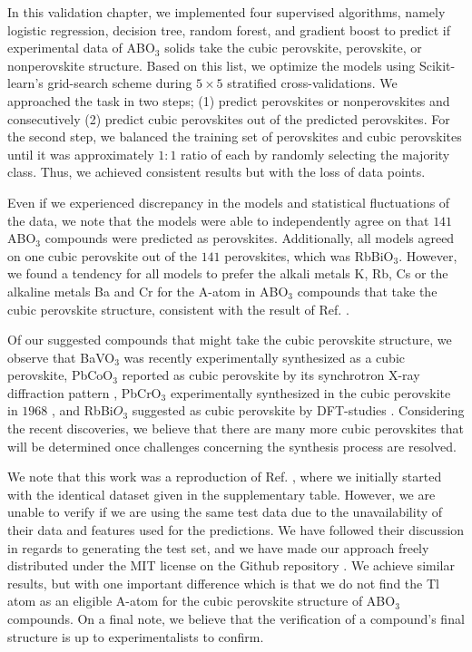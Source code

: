 In this validation chapter, we implemented four supervised algorithms, namely logistic regression, decision tree, random forest, and gradient boost to predict if experimental data of ABO$_3$ solids take the cubic perovskite, perovskite, or nonperovskite structure. Based on this list, we optimize the models using Scikit-learn's \cite{Pedregosa2012} grid-search scheme during $5\times 5$ stratified cross-validations. We approached the task in two steps; (1) predict perovskites or nonperovskites and consecutively (2) predict cubic perovskites out of the predicted perovskites. For the second step, we balanced the training set of perovskites and cubic perovskites until it was approximately $1:1$ ratio of each by randomly selecting the majority class. Thus, we achieved consistent results but with the loss of data points.

Even if we experienced discrepancy in the models and statistical fluctuations of the data, we note that the models were able to independently agree on that $141$ ABO$_3$ compounds were predicted as perovskites. Additionally, all models agreed on one cubic perovskite out of the $141$ perovskites, which was RbBiO$_3$. However, we found a tendency for all models to prefer the alkali metals K, Rb, Cs or the alkaline metals Ba and Cr for the A-atom in ABO$_3$ compounds that take the cubic perovskite structure, consistent with the result of Ref. \cite{Balachandran2018}.

Of our suggested compounds that might take the cubic perovskite structure, we observe that BaVO$_3$ was recently experimentally synthesized \cite{Nishimura2014} as a cubic perovskite, PbCoO$_3$ reported as cubic perovskite by its synchrotron X-ray diffraction pattern \cite{Sakai2017}, PbCrO$_3$ experimentally synthesized in the cubic perovskite in $1968$ \cite{DeVRIES1968}, and RbBi$O_3$ suggested as cubic perovskite by DFT-studies \cite{Khamari2017}. Considering the recent discoveries, we believe that there are many more cubic perovskites that will be determined once challenges concerning the synthesis process are resolved.


We note that this work was a reproduction of Ref. \cite{Balachandran2018}, where we initially started with the identical dataset given in the supplementary table. However, we are unable to verify if we are using the same test data due to the unavailability of their data and features used for the predictions. We have followed their discussion in regards to generating the test set, and we have made our approach freely distributed under the MIT license on the Github repository \cite{Ohebbi2021a}. We achieve similar results, but with one important difference which is that we do not find the Tl atom as an eligible A-atom for the cubic perovskite structure of ABO$_3$ compounds. On a final note, we believe that the verification of a compound's final structure is up to experimentalists to confirm.
